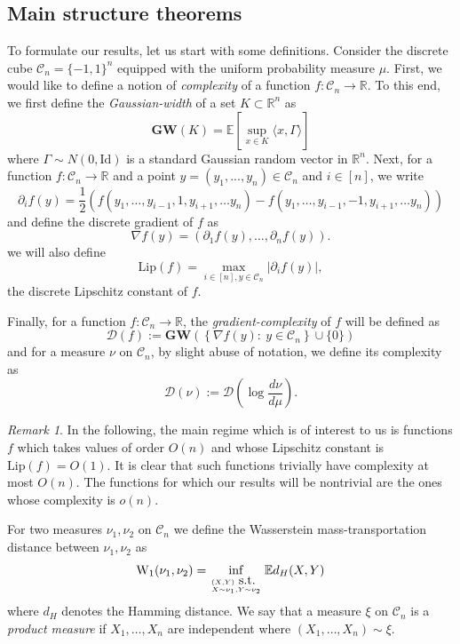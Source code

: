 \documentclass[12pt]{article}
\def \W{\mathrm{W_1}}
\def \RR {\mathbb R}
\def \EE {\mathbb E}
\def \Lip {\mathrm {Lip}}
\def \DC {\mathcal{C}_n}
\def \MW {\mathbf{GW}}
\def \Comp { \mathcal{D} }
\theoremstyle{definition}
\theoremstyle{remark}
\newtheorem{remark}{Remark}
\begin{document}
\subsection{Main structure theorems}
To formulate our results, let us start with some definitions. Consider the discrete cube $\DC = \{-1,1\}^n$ equipped with the uniform probability measure $\mu$. First, we would like to define a notion of \emph{complexity} of a function $f:\DC \to \RR$. To this end, we first define the \emph{Gaussian-width} of a set $K \subset \RR^n$ as 
$$
\MW(K) = \EE \left [ \sup_{x \in K} \langle x, \Gamma \rangle \right ]
$$
where $\Gamma \sim N(0, \mathrm{Id})$ is a standard Gaussian random vector in $\RR^n$. Next, for a function $f:\DC \to \RR$ and a point $y = (y_1,...,y_n) \in \DC$ and $i \in [n]$, we write
$$
\partial_i f(y) = \frac{1}{2} \left (f(y_1,\dots, y_{i-1}, 1, y_{i+1}, \dots y_n) - f(y_1,\dots, y_{i-1}, -1, y_{i+1}, \dots y_n) \right )
$$
and define the discrete gradient of $f$ as
\begin{equation}\label{def:discg}
\nabla f(y) = (\partial_1 f(y), \dots, \partial_n f(y)).
\end{equation}
we will also define
$$
\Lip(f) = \max_{i \in [n], y \in \DC} | \partial_i f(y)|,
$$
the discrete Lipschitz constant of $f$.

Finally, for a function $f:\DC \to \RR$, the \emph{gradient-complexity} of $f$ will be defined as
\begin{equation}\label{eq:defcomplexity}
\Comp(f) := \MW \left (  \left \{\nabla f(y): ~ y \in \DC  \right \} \cup \{0\} \right )
\end{equation}
and for a measure $\nu$ on $\DC$, by slight abuse of notation, we define its complexity as 
$$\Comp(\nu) := \Comp \left (\log \frac{d \nu}{d \mu} \right ).
$$

\begin{remark}
In the following, the main regime which is of interest to us is functions $f$ which takes values of order $O(n)$ and whose Lipschitz constant is $\Lip(f) = O(1)$. It is clear that such functions trivially have complexity at most $O(n)$. The functions for which our results will be nontrivial are the ones whose complexity is $o(n)$.
\end{remark}
	
For two measures $\nu_1,\nu_2$ on $\DC$ we define the Wasserstein mass-transportation distance between $\nu_1,\nu_2$ as
$$
\W(\nu_1,\nu_2) = \inf_{(X,Y) \mbox{ s.t. } \atop X \sim \nu_1, Y \sim \nu_2} \EE d_H(X,Y) 
$$
where $d_H$ denotes the Hamming distance. We say that a measure $\xi$ on $\DC$ is a \emph{product measure} if $X_1,\dots,X_n$ are independent where $(X_1,\dots,X_n) \sim \xi$.
\end{document}
